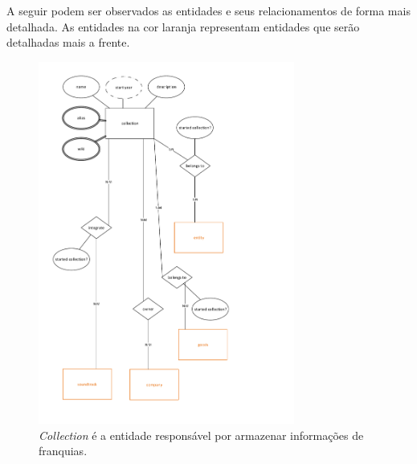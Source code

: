 \documentclass[12pt]{article}
\begin{document}
A seguir podem ser observados as entidades e seus relacionamentos de forma mais detalhada. As entidades na cor laranja representam entidades que serão detalhadas mais a frente.
\begin{figure}[H]
\centering
\includegraphics[height=0.85\textheight, width=0.75\textwidth]{MER_-_Collection.pdf}
\caption{\textit{Collection} é a entidade responsável por armazenar informações de franquias.} \label{collection}
\end{figure}
\end{document}
